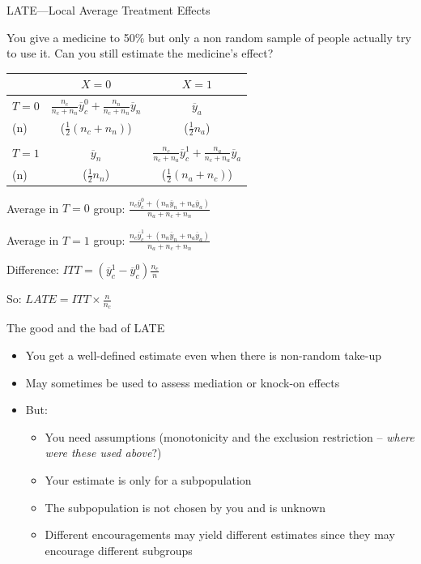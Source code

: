\documentclass[
  11pt,
  ignorenonframetext,
]{beamer}
\providecommand{\tightlist}{%
  \setlength{\itemsep}{0pt}\setlength{\parskip}{0pt}}\usepackage{longtable,booktabs,array}
\begin{document}
\begin{frame}{LATE---Local Average Treatment Effects}
\protect\hypertarget{latelocal-average-treatment-effects-2}{}
\footnotesize

You give a medicine to 50\% but only a non random sample of people
actually try to use it. Can you still estimate the medicine's effect?

\begin{table}
\scriptsize
\centering
\begin{tabular}{l|cc}
&$X=0$&$X=1$\\ \hline
$T=0$ & $\frac{n_c}{n_c + n_n} \overline{y}^0_{c}+\frac{n_n}{n_c + n_n} \overline{y}_n$ &  $\overline{y}_{a}$ \\
(n)&   ($\frac{1}{2}(n_c + n_n)$) &  ($\frac{1}{2}n_a$)\\ \\
$T=1$& $\overline{y}_{n}$ & $\frac{n_c}{n_c + n_a} \overline{y}^1_{c}+\frac{n_a}{n_c + n_a} \overline{y}_{a}$  \\
(n)&  ($\frac{1}{2}n_n$) &  ($\frac{1}{2}(n_a+n_c)$)\\

\end{tabular}
\end{table}

Average in \(T=0\) group:
\(\frac{{n_c} \overline{y}^0_{c}+ \left(n_{n}\overline{y}_{n} +{n_a} \overline{y}_a\right)}{n_a+n_c+n_n}\)

Average in \(T=1\) group:
\(\frac{{n_c} \overline{y}^1_{c} + \left(n_{n}\overline{y}_{n} +{n_a} \overline{y}_a \right)}{n_a+n_c+n_n}\)

Difference: \(ITT = ({\overline{y}^1_c-\overline{y}^0_c})\frac{n_c}{n}\)

So: \(LATE = ITT\times\frac{n}{n_c}\)
\end{frame}

\begin{frame}{The good and the bad of LATE}
\protect\hypertarget{the-good-and-the-bad-of-late}{}
\begin{itemize}
\tightlist
\item
  You get a well-defined estimate even when there is non-random take-up
\item
  May sometimes be used to assess mediation or knock-on effects
\item
  But:

  \begin{itemize}
  \tightlist
  \item
    You need assumptions (monotonicity and the exclusion restriction --
    \emph{where were these used above}?)
  \item
    Your estimate is only for a subpopulation
  \item
    The subpopulation is not chosen by you and is unknown
  \item
    Different encouragements may yield different estimates since they
    may encourage different subgroups
  \end{itemize}
\end{itemize}
\end{frame}
\end{document}
